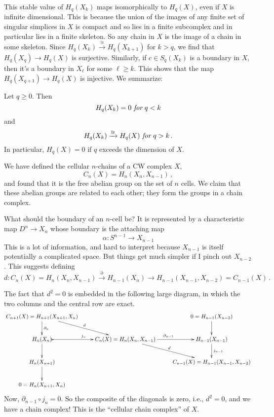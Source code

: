 This stable value of $H_q(X_k)$ maps isomorphically to $H_q(X)$, 
even if $X$ is infinite 
dimensional. This is because the union of the images of any finite set of 
singular simplices in $X$ is compact and so lies in a finite subcomplex and in
particular lies in a finite skeleton. So any chain in $X$ is the image of 
a chain in some skeleton. Since $H_q(X_k)\xrightarrow{\cong}H_q(X_{k+1})$ for 
$k>q$, we find that $H_q(X_q)\to H_q(X)$ is surjective. Similarly, 
if $c\in S_q(X_k)$ is a boundary in $X$, then it's a boundary in $X_\ell$ 
for some $\ell\geq k$. This shows that the map $H_q(X_{q+1})\to H_q(X)$ is
injective. We summarize:
\begin{lemma} 
Let $q\geq 0$. Then 
\[
H_q(X_k)=0\,\,\hbox{\em for}\,\,q<k
\]
and
\[
H_q(X_k)\xrightarrow{\cong}H_q(X)\,\,\hbox{\em for}\,\,q>k\,.
\]
In particular, $H_q(X)=0$ if $q$ exceeds the dimension of $X$. 
\end{lemma}






We have defined the cellular $n$-chains of a CW complex $X$,
\[
C_n(X)=H_n(X_n,X_{n-1})\,,
\]
and found that it is the free abelian group on the set of $n$ cells. 
We claim that these abelian groups are related to each other; they form 
the groups in a chain complex. 

What should the boundary of an $n$-cell be? It is represented by 
a characteristic map $D^n\to X_n$ whose boundary is the attaching map 
\[
\alpha:S^{n-1}\to X_{n-1}
\]
This is a lot of information, and hard to interpret because $X_{n-1}$ is itself
potentially a complicated space. But things get much simpler if I pinch out
$X_{n-2}$. This suggests defining 
\[
d:C_n(X)=H_n(X_n,X_{n-1})\xrightarrow{\partial} H_{n-1}(X_n)\rightarrow 
H_{n-1}(X_{n-1},X_{n-2})=C_{n-1}(X)\,.
\]

The fact that $d^2=0$ is embedded in the following large diagram, in which 
the two columns and the central row are exact. 
\begin{equation*}
\xymatrix{C_{n+1}(X)= H_{n+1}(X_{n+1},X_n)\ar[d]^{\partial_n}\ar[dr]^d & & 0= H_{n-1}(X_{n-2})\ar[d]\\
 H_n(X_n)\ar@{>->}[r]^{j_n}\ar[d] & C_n(X)= H_n(X_n,X_{n-1})\ar[r]^{\partial_{n-1}}\ar[dr]^d & H_{n-1}(X_{n-1})\ar[d]^{j_{n-1}}\\
 H_n(X_{n+1})\ar[d] & & C_{n-1}(X)= H_{n-1}(X_{n-1},X_{n-2})\\
0 = H_n(X_{n+1},X_n)}
\end{equation*}
Now, $\partial_{n-1}\circ j_n=0$. So the composite of the diagonals is zero, i.e., $d^2=0$, and we have a chain complex! This is the ``cellular chain complex'' of $X$. 

